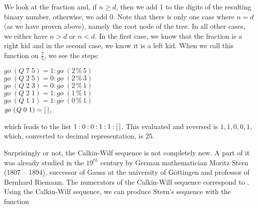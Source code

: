 \documentclass[tikz]{scrreprt}
\newcommand{\Conid}[1]{\mathit{#1}}
\newcommand{\Varid}[1]{\mathit{#1}}
\begin{document}
We look at the fraction and, if $n\ge d$,
then we add 1 to the digits of the 
resulting binary number, otherwise,
we add 0.
Note that there is only one case where $n = d$
(as we have proven above), namely the root node
of the tree. In all other cases, we either have
$n>d$ or $n<d$.
In the first case, we know that the fraction
is a right kid and in the second case,
we know it is a left kid.
When we call this function on $\frac{7}{5}$,
we see the steps:

\begin{minipage}{\textwidth}
\ensuremath{\Varid{go}\;(\Conid{Q}\;\mathrm{7}\;\mathrm{5})\mathrel{=}\mathrm{1}\mathbin{:}\Varid{go}\;(\mathrm{2}\mathbin{\%}\mathrm{5})}\\
\ensuremath{\Varid{go}\;(\Conid{Q}\;\mathrm{2}\;\mathrm{5})\mathrel{=}\mathrm{0}\mathbin{:}\Varid{go}\;(\mathrm{2}\mathbin{\%}\mathrm{3})}\\
\ensuremath{\Varid{go}\;(\Conid{Q}\;\mathrm{2}\;\mathrm{3})\mathrel{=}\mathrm{0}\mathbin{:}\Varid{go}\;(\mathrm{2}\mathbin{\%}\mathrm{1})}\\
\ensuremath{\Varid{go}\;(\Conid{Q}\;\mathrm{2}\;\mathrm{1})\mathrel{=}\mathrm{1}\mathbin{:}\Varid{go}\;(\mathrm{1}\mathbin{\%}\mathrm{1})}\\
\ensuremath{\Varid{go}\;(\Conid{Q}\;\mathrm{1}\;\mathrm{1})\mathrel{=}\mathrm{1}\mathbin{:}\Varid{go}\;(\mathrm{0}\mathbin{\%}\mathrm{1})}\\
\ensuremath{\Varid{go}\;(\Conid{Q}\;\mathrm{0}\;\mathrm{1})\mathrel{=}[\mskip1.5mu \mskip1.5mu]},
\end{minipage}

which leads to the list \ensuremath{\mathrm{1}\mathbin{:}\mathrm{0}\mathbin{:}\mathrm{0}\mathbin{:}\mathrm{1}\mathbin{:}\mathrm{1}\mathbin{:}[\mskip1.5mu \mskip1.5mu]}.
This evaluated and reversed is \ensuremath{\mathrm{1},\mathrm{1},\mathrm{0},\mathrm{0},\mathrm{1}},
which, converted to decimal representation, is 25.

Surprisingly or not, the Calkin-Wilf sequence
is not completely new. A part of it was already studied
in the $19^{th}$ century by 
German mathematician Moritz Stern (1807 -- 1894),
successor of Gauss at the university of Göttingen
and professor of Bernhard Riemann.
The numerators of the Calkin-Wilf sequence correspond to 
.
Using the Calkin-Wilf sequence,
we can produce Stern's sequence with the function
\end{document}
